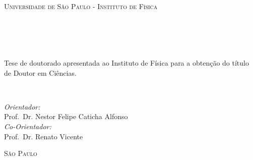 \begin{titlepage}
\begin{fullwidth}
\begin{center}


\textsc{\LARGE Universidade de São Paulo - Instituto de Física}\\[3cm]

\HRule \\[0.4cm]
\textsc{\textit{\titlefont {\titletext}\\[1.0cm] \subtitlefont {\subtitletext}}}
\HRule\\[2.2cm]
\textsc{\LARGE \authorinfo }\\[1.5cm]
\hfill\begin{minipage}{0.7\textwidth}
\Large
Tese de doutorado apresentada ao Instituto de Física para a obtenção do título de Doutor em Ciências. 
\end{minipage}\\[1.cm]
\hfill\begin{minipage}{0.7\textwidth}
\Large

\emph{Orientador:} \\
Prof.~Dr. Nestor Felipe Caticha Alfonso\\

\emph{Co-Orientador:} \\
Prof.~Dr. Renato Vicente
\end{minipage}
\vfill

\textsc{\LARGE São Paulo}\\
\textsc{\LARGE \the\year}

\end{center}
\end{fullwidth}
\end{titlepage}